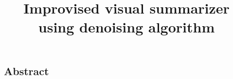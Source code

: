\documentclass[12pt,oneside,a4paper]{book} %
\title{Improvised visual summarizer using denoising algorithm}
\begin{document}
\maketitle
\newpage
\begin{spacing}{1.5}

\newpage

\newpage

\newpage
{}
\chapter*{Abstract}

\end{spacing}
\newpage
\pagestyle{fplain}
\begin{spacing}{1.5}
	\tableofcontents	
\end{spacing}
\newpage
\begin{spacing}{1.5}
	\cleardoublepage
	\listoffigures	
\end{spacing}
\newpage
\begin{spacing}{1.5}
	\cleardoublepage
	\listoftables	
\end{spacing}
\newpage
\printglossary[type=\acronymtype, title= Abbreviations, toctitle=Abbreviations]
\newpage

\mainmatter
\pagestyle{mplain}
\glsresetall
\begin{spacing}{1.5}














\backmatter
\clearpage
\printbibliography%
\end{spacing}
\end{document}
